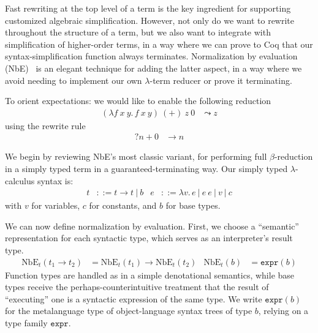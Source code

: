 \documentclass[a4paper,USenglish,cleveref,autoref,thm-restate]{lipics-v2021}
\newcommand{\defeq}{=}
\begin{document}
Fast rewriting at the top level of a term is the key ingredient for supporting customized algebraic simplification.
However, not only do we want to rewrite throughout the structure of a term, but we also want to integrate with simplification of higher-order terms, in a way where we can prove to Coq that our syntax-simplification function always terminates.
Normalization by evaluation (NbE)~\cite{NbE} is an elegant technique for adding the latter aspect, in a way where we avoid needing to implement our own $\lambda$-term reducer or prove it terminating.

To orient expectations: we would like to enable the following reduction
\begin{align*}
  (\lambda f\ x\ y.\, f\ x\ y)\ (+)\ z\ 0 & \leadsto z
\end{align*}
\noindent using the rewrite rule
\begin{align*}
  ?n + 0 & \to n
\end{align*}

We begin by reviewing NbE's most classic variant, for performing full $\beta$-reduction in a simply typed term in a guaranteed-terminating way.
Our simply typed $\lambda$-calculus syntax is:
\begin{align*}
  t & ::= t \to t ~|~ b
  & e & ::= \lambda v.\, e ~|~ e~e ~|~ v ~|~ c
\end{align*}
\noindent with $v$ for variables, $c$ for constants, and $b$ for base types.

We can now define normalization by evaluation.
First, we choose a ``semantic'' representation for each syntactic type, which serves as an interpreter's result type.
\begin{align*}
  \text{NbE}_t(t_1 \to t_2) & \defeq \text{NbE}_t(t_1) \to \text{NbE}_t(t_2)
  & \text{NbE}_t(b) & \defeq \texttt{expr}(b)
\end{align*}
Function types are handled as in a simple denotational semantics, while base types receive the perhaps-counterintuitive treatment that the result of ``executing'' one is a syntactic expression of the same type.
We write $\texttt{expr}(b)$ for the metalanguage type of object-language syntax trees of type $b$, relying on a type family $\texttt{expr}$.
\end{document}
